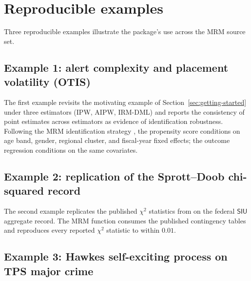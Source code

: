 \documentclass[article,shortnames,nojss]{jss}
\newcommand{\OTIS}{\textsf{OTIS}}
\newcommand{\SIU}{\textsf{SIU}}
\begin{document}
\section{Reproducible examples}
\label{sec:examples}

Three reproducible examples illustrate the package's use across
the MRM source set.

\subsection[Example 1: alert complexity and placement volatility (OTIS)]{Example 1: alert complexity and placement volatility (\OTIS{})}

The first example revisits the motivating example of
Section~\ref{sec:getting-started} under three estimators
(IPW, AIPW, IRM-DML) and reports the consistency of point
estimates across estimators as evidence of identification
robustness. Following the MRM identification strategy
\citep{Ruhela2026MRM}, the propensity score conditions on age band,
gender, regional cluster, and fiscal-year fixed effects; the
outcome regression conditions on the same covariates.

\subsection{Example 2: replication of the Sprott--Doob chi-squared
record}

The second example replicates the published $\chi^{2}$ statistics
from \citet{SprottDoob2023} on the federal $\SIU$ aggregate
record. The MRM  function consumes the
published contingency tables and reproduces every reported
$\chi^{2}$ statistic to within $0.01$.

\subsection{Example 3: Hawkes self-exciting process on TPS major
crime}
\end{document}
